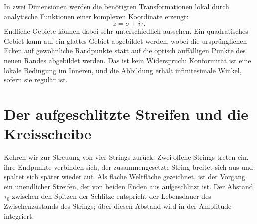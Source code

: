 \begin{classroomqa}
\end{classroomqa}

In zwei Dimensionen werden die benötigten Transformationen lokal durch analytische Funktionen einer komplexen Koordinate erzeugt:
\begin{equation}
  z=\sigma+i\tau.
\end{equation}
Endliche Gebiete können dabei sehr unterschiedlich aussehen. Ein quadratisches Gebiet kann auf ein glattes Gebiet abgebildet werden, wobei die ursprünglichen Ecken auf gewöhnliche Randpunkte statt auf die optisch auffälligen Punkte des neuen Randes abgebildet werden. Das ist kein Widerspruch: Konformität ist eine lokale Bedingung im Inneren, und die Abbildung erhält infinitesimale Winkel, sofern sie regulär ist.

\begin{classroomqa}
\end{classroomqa}

\section{Der aufgeschlitzte Streifen und die Kreisscheibe}

Kehren wir zur Streuung von vier Strings zurück. Zwei offene Strings treten ein, ihre Endpunkte verbinden sich, der zusammengesetzte String breitet sich aus und spaltet sich später wieder auf. Als flache Weltfläche gezeichnet, ist der Vorgang ein unendlicher Streifen, der von beiden Enden aus aufgeschlitzt ist. Der Abstand \(\tau_0\) zwischen den Spitzen der Schlitze entspricht der Lebensdauer des Zwischenzustands des Strings; über diesen Abstand wird in der Amplitude integriert.

